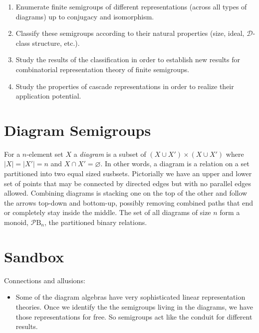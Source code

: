 \documentclass{amsart}
\newcommand{\BinRel}{\text{B}}
\newcommand{\Partition}{\mathcal P}
\newcommand{\cD}{\mathcal D}
\newcommand{\todo}[1]{ \textsf{\color{red}{[TODO:  #1 ]}}}
\begin{document}
\begin{enumerate}
\item Enumerate finite semigroups of different representations (across all types of diagrams) up to conjugacy and isomorphism.
\item Classify these semigroups according to their natural properties (size, ideal, $\cD$-class structure, etc.).
\item Study the results of the classification in order to establish new results for combinatorial representation theory of finite semigroups.
\item Study the properties of cascade representations in order to realize their application potential.
\end{enumerate}


\section{Diagram Semigroups}

For a $n$-element set $X$ a \emph{diagram} is a subset of $(X\cup X')\times (X\cup X')$ where $|X|=|X'|=n$ and $X\cap X'=\varnothing$.
In other words, a diagram is a relation on a set partitioned into two equal sized susbsets.
Pictorially we have an upper and lower set of points that may be connected by directed edges but with no parallel edges allowed.
Combining diagrams is stacking one on the top of the other and follow the arrows top-down and bottom-up, possibly removing combined paths that end or completely stay inside the middle. \todo{This isn't very precise, is it?}
The set of all diagrams of size $n$ form a monoid, $\Partition\BinRel_n$, the partitioned binary relations. 



\section{Sandbox}

Connections and allusions:
\begin{itemize}
\item Some of the diagram algebras have very sophisticated linear representation theories. Once we identify the the semigroups living in the diagrams, we have those representations for free. So semigroups act like the conduit for different results.
\end{itemize}
\end{document}
